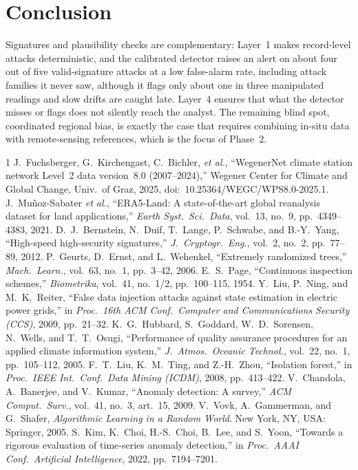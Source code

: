 \documentclass[conference]{IEEEtran}
\begin{document}
\section{Conclusion}

Signatures and plausibility checks are complementary: Layer~1 makes record-level attacks deterministic, and
the calibrated detector raises an alert on about four out of five valid-signature attacks at a low
false-alarm rate, including attack families it never saw, although it flags only about one in three
manipulated readings and slow drifts are caught late. Layer~4 ensures that what the detector misses or
flags does not silently reach the analyst. The remaining blind spot, coordinated regional bias, is exactly the
case that requires combining in-situ data with remote-sensing references, which is the focus of Phase~2.


\begin{thebibliography}{1}
J.~Fuchsberger, G.~Kirchengast, C.~Bichler, \emph{et al.}, ``WegenerNet climate station network Level~2 data
version~8.0 (2007--2024),'' Wegener Center for Climate and Global Change, Univ.\ of Graz, 2025,
doi:~10.25364/WEGC/WPS8.0-2025.1.
J.~Mu\~noz-Sabater \emph{et al.}, ``ERA5-Land: A state-of-the-art global reanalysis dataset for land
applications,'' \emph{Earth Syst.\ Sci.\ Data}, vol.~13, no.~9, pp.~4349--4383, 2021.
D.~J.~Bernstein, N.~Duif, T.~Lange, P.~Schwabe, and B.-Y.~Yang, ``High-speed high-security signatures,''
\emph{J.\ Cryptogr.\ Eng.}, vol.~2, no.~2, pp.~77--89, 2012.
P.~Geurts, D.~Ernst, and L.~Wehenkel, ``Extremely randomized trees,'' \emph{Mach.\ Learn.}, vol.~63, no.~1,
pp.~3--42, 2006.
E.~S.~Page, ``Continuous inspection schemes,'' \emph{Biometrika}, vol.~41, no.~1/2, pp.~100--115, 1954.
Y.~Liu, P.~Ning, and M.~K.~Reiter, ``False data injection attacks against state estimation in electric power
grids,'' in \emph{Proc.\ 16th ACM Conf.\ Computer and Communications Security (CCS)}, 2009, pp.~21--32.
K.~G.~Hubbard, S.~Goddard, W.~D.~Sorensen, N.~Wells, and T.~T.~Osugi, ``Performance of quality assurance
procedures for an applied climate information system,'' \emph{J.\ Atmos.\ Oceanic Technol.}, vol.~22, no.~1,
pp.~105--112, 2005.
F.~T.~Liu, K.~M.~Ting, and Z.-H.~Zhou, ``Isolation forest,'' in \emph{Proc.\ IEEE Int.\ Conf.\ Data Mining
(ICDM)}, 2008, pp.~413--422.
V.~Chandola, A.~Banerjee, and V.~Kumar, ``Anomaly detection: A survey,'' \emph{ACM Comput.\ Surv.}, vol.~41,
no.~3, art.~15, 2009.
V.~Vovk, A.~Gammerman, and G.~Shafer, \emph{Algorithmic Learning in a Random World}. New York, NY, USA:
Springer, 2005.
S.~Kim, K.~Choi, H.-S.~Choi, B.~Lee, and S.~Yoon, ``Towards a rigorous evaluation of time-series anomaly
detection,'' in \emph{Proc.\ AAAI Conf.\ Artificial Intelligence}, 2022, pp.~7194--7201.
\end{thebibliography}
\end{document}
